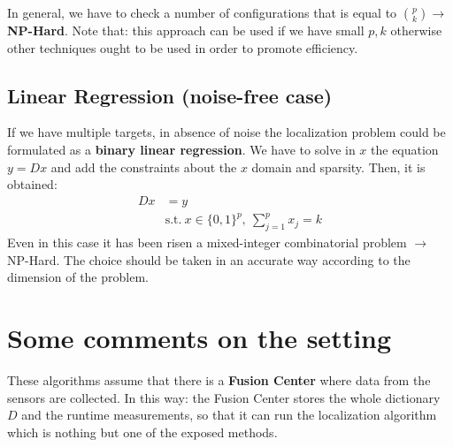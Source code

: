 In general, we have to check a number of configurations that is equal to $\binom{p}{k} \rightarrow$ \textbf{NP-Hard}. Note that: this approach can be used if we have small $p, k$ otherwise other techniques ought to be used in order to promote efficiency.

\subsection{Linear Regression (noise-free case)}
If we have multiple targets, in absence of noise the localization problem could be formulated as a \textbf{binary linear regression}. We have to solve in $x$ the equation $y=Dx$ and add the constraints about the $x$ domain and sparsity. Then, it is obtained:
\begin{equation}
	\begin{aligned}
		Dx&=y\\
		&\text{s.t.} \ x\in\{0,1\}^p, \ \sum_{j=1}^{p}x_j=k
	\end{aligned}
\end{equation}
Even in this case it has been risen a mixed-integer combinatorial problem $\rightarrow$ NP-Hard. The choice should be taken in an accurate way according to the dimension of the problem.

\section{Some comments on the setting}
These algorithms assume that there is a \textbf{Fusion Center} where data from the sensors are collected. In this way: the Fusion Center stores the whole dictionary $D$ and the runtime measurements, so that it can run the localization algorithm which is nothing but one of the exposed methods.
